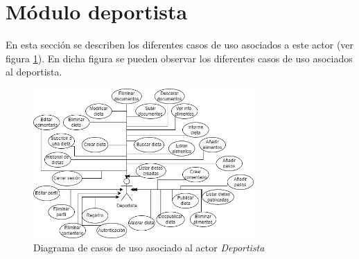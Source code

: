 \section{Módulo deportista}
En esta sección se describen los diferentes casos de uso asociados a este actor (ver figura \ref{fig:diagrama_cu_deportista}). En dicha figura se pueden observar los diferentes casos de uso asociados al deportista.

\begin{figure}[h!]
    \centering
    \includegraphics[width=0.75\textwidth]{Images/Capitulo4/cu-deportista.png}
    \caption{Diagrama de casos de uso asociado al actor \textit{Deportista}}
    \label{fig:diagrama_cu_deportista}
\end{figure}

\newpage %

